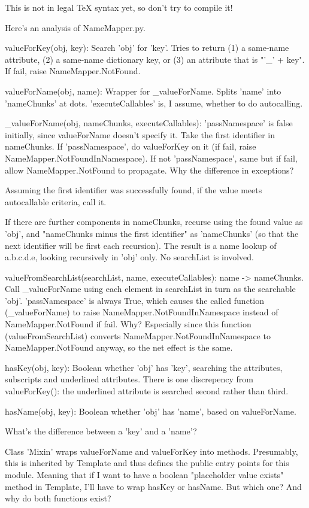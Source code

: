 This is not in legal TeX syntax yet, so don't try to compile it!

Here's an analysis of NameMapper.py.

	valueForKey(obj, key):
Search 'obj' for 'key'.  Tries to return (1) a same-name attribute, (2)
a same-name dictionary key, or (3) an attribute that is "'_' + key".
If fail, raise NameMapper.NotFound.

	valueForName(obj, name):
Wrapper for _valueForName.  Splits 'name' into 'nameChunks' at dots.
'executeCallables' is, I assume, whether to do autocalling.

	_valueForName(obj, nameChunks, executeCallables):
'passNamespace' is false initially, since valueForName doesn't specify it.
Take the first identifier in nameChunks.  If 'passNamespace', do
valueForKey on it (if fail, raise NameMapper.NotFoundInNamespace).
If not 'passNamespace', same but if fail, allow NameMapper.NotFound to
propagate.  Why the difference in exceptions?

Assuming the first identifier was successfully found, if the value meets
autocallable criteria, call it.  

If there are further components in nameChunks, recurse using the found
value as 'obj', and "nameChunks minus the first identifier" as
'nameChunks' (so that the next identifier will be first each recursion).
The result is a name lookup of a.b.c.d.e, looking recursively in 'obj' only.
No searchList is involved.

	valueFromSearchList(searchList, name, executeCallables):
name -> nameChunks.  Call _valueForName using each element in searchList
in turn as the searchable 'obj'.  'passNamespace' is always True, which
causes the called function (_valueForName) to raise
NameMapper.NotFoundInNamespace instead of NameMapper.NotFound if fail.
Why?  Especially since this function (valueFromSearchList) converts
NameMapper.NotFoundInNamespace to NameMapper.NotFound anyway, so the net 
effect is the same.

	hasKey(obj, key):
Boolean whether 'obj' has 'key', searching the attributes, subscripts
and underlined attributes.  There is one discrepency from 
valueForKey(): the underlined attribute is searched second rather than
third.

	hasName(obj, key):
Boolean whether 'obj' has 'name', based on valueForName.  

What's the difference between a 'key' and a 'name'?

Class 'Mixin' wraps valueForName and valueForKey into methods. 
Presumably, this is inherited by Template and thus defines the public
entry points for this module.  Meaning that if I want to have a 
boolean "placeholder value exists" method in Template, I'll have to
wrap hasKey or hasName.  But which one?  And why do both functions exist?
